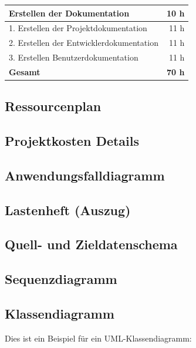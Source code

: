 \documentclass[11pt,toc=sectionentrywithoutdots, 
headheight=44pt, headings=optiontoheadandtoc, hyperfootnotes=false]{scrartcl}
\begin{document}
\begin{table}[ht]
\begin{center}
\begin{tabular}{ ||l|r|| }
			\textbf{Erstellen der Dokumentation} 						& \textbf{10 h}	\\
			\hline
			1. Erstellen der Projektdokumentation						& 11 h 			\\
			2. Erstellen der Entwicklerdokumentation					& 11 h 			\\
			3. Erstellen Benutzerdokumentation							& 11 h 			\\
			\hline

			\textbf{Gesamt}	 											& \textbf{70 h}	\\
			\hline

		\end{tabular}
	\end{center}
\end{table}	

\subsection{Ressourcenplan}
\blindtext\blindtext

\subsection{Projektkosten Details}
\blindtext\blindtext

\subsection{Anwendungsfalldiagramm}
\blindtext\blindtext

\subsection{Lastenheft (Auszug)}
\blindtext\blindtext

\subsection{Quell- und Zieldatenschema}
\blindtext\blindtext

\subsection{Sequenzdiagramm}
\blindtext
\clearpage

\subsection{Klassendiagramm}

Dies ist ein Beispiel für ein UML-Klassendiagramm:\\
\end{document}
